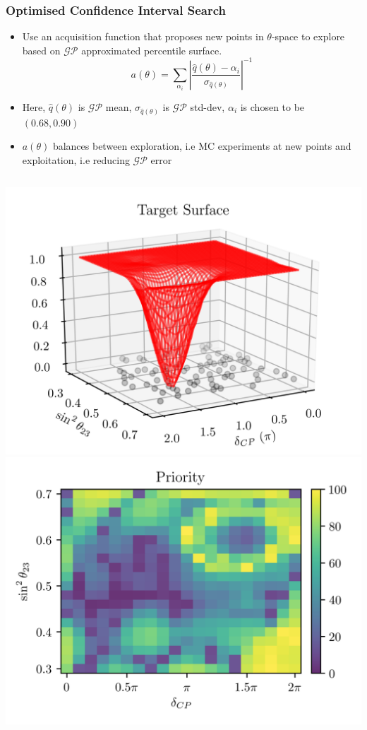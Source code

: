 \documentclass[9pt, aspectratio=169]{beamer}
\begin{document}
\begin{frame}
  \frametitle{Optimised Confidence Interval Search}
  \begin{itemize}
    \item Use an acquisition function that proposes new points in $\theta$-space to explore based on $\mathcal{GP}$ approximated percentile surface.
      \begin{equation*}
    a(\theta) = \sum_{\alpha_i}|\frac{\hat{q}(\theta)-\alpha_i}{\sigma_{\hat{q}(\theta)}}|^{-1}
      \end{equation*}
    \item Here, $\hat{q}(\theta)$ is $\mathcal{GP}$ mean, $\sigma_{\hat{q}(\theta)}$ is $\mathcal{GP}$ std-dev, $\alpha_i$ is chosen to be $(0.68, 0.90)$
    \item $a(\theta)$ balances between exploration, i.e MC experiments at new points and exploitation, i.e reducing $\mathcal{GP}$ error
  \end{itemize}
  \begin{columns}
    \includegraphics[scale=0.6]{figures_final/surface_sdcp_inverted_start.png}
    \includegraphics[scale=0.6]{figures_final/priority_2d_sdcp_inverted_start.png}

\end{columns}
\end{frame}
\end{document}
